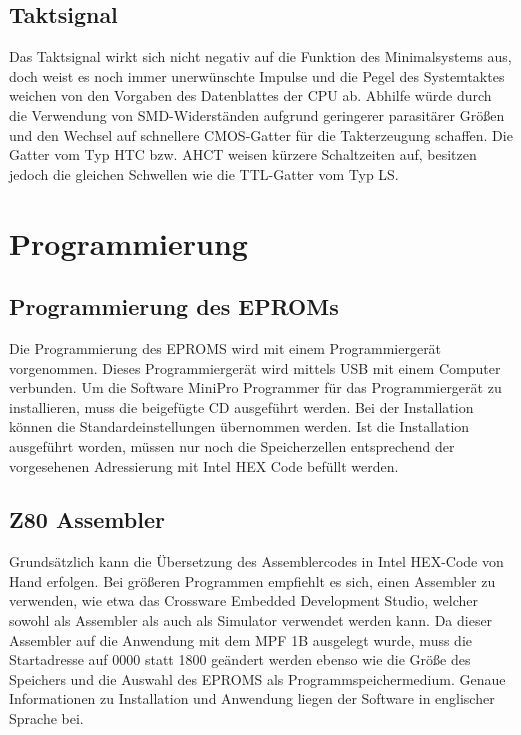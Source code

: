 \subsection{Taktsignal}
Das Taktsignal wirkt sich nicht negativ auf die Funktion des Minimalsystems aus, doch weist es noch immer unerwünschte Impulse und die Pegel des Systemtaktes weichen von den Vorgaben des Datenblattes der CPU ab. Abhilfe würde durch die Verwendung von SMD-Widerständen aufgrund geringerer parasitärer Größen und den Wechsel auf schnellere CMOS-Gatter für die Takterzeugung schaffen. Die Gatter vom Typ HTC bzw. AHCT weisen kürzere Schaltzeiten auf, besitzen jedoch die gleichen Schwellen wie die TTL-Gatter vom Typ LS.

\section{Programmierung}
\label{sec:z80-programmierung}
\subsection{Programmierung des EPROMs}
Die Programmierung des EPROMS wird mit einem Programmiergerät vorgenommen. Dieses Programmiergerät wird mittels USB mit einem Computer verbunden. Um die Software MiniPro Programmer für das Programmiergerät zu installieren, muss die beigefügte CD ausgeführt werden. Bei der Installation können die Standardeinstellungen übernommen werden. Ist die Installation ausgeführt worden, müssen nur noch die Speicherzellen entsprechend der vorgesehenen Adressierung mit Intel HEX Code befüllt werden.

\subsection{Z80 Assembler}
Grundsätzlich kann die Übersetzung des Assemblercodes in Intel HEX-Code von Hand erfolgen. Bei größeren Programmen empfiehlt es sich, einen Assembler zu verwenden, wie etwa das Crossware Embedded Development Studio, welcher sowohl als Assembler als auch als Simulator verwendet werden kann. Da dieser Assembler auf die Anwendung mit dem MPF 1B ausgelegt wurde, muss die Startadresse auf 0000 statt 1800 geändert werden ebenso wie die Größe des Speichers und die Auswahl des EPROMS als Programmspeichermedium. Genaue Informationen zu Installation und Anwendung liegen der Software in englischer Sprache bei.

